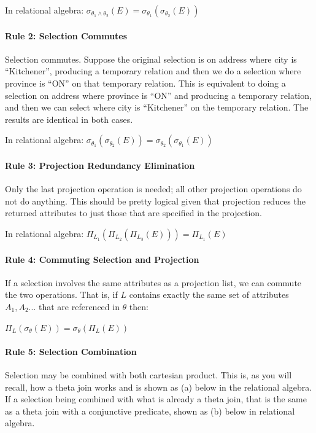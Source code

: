 In relational algebra: $\sigma_{\theta_{1} \wedge \theta_{2}}(E) = \sigma_{\theta_{1}}(\sigma_{\theta_{2}}(E))$


\paragraph{Rule 2: Selection Commutes}
Selection commutes. Suppose the original selection is on address where city is ``Kitchener'', producing a temporary relation and then we do a selection where province is ``ON'' on that temporary relation. This is equivalent to doing a selection on address where province is ``ON'' and producing a temporary relation, and then we can select where city is ``Kitchener'' on the temporary relation. The results are identical in both cases. 

In relational algebra: $\sigma_{\theta_{1}}(\sigma_{\theta_{2}}(E)) = \sigma_{\theta_{2}}(\sigma_{\theta_{1}}(E))$

\paragraph{Rule 3: Projection Redundancy Elimination}

Only the last projection operation is needed; all other projection operations do not do anything. This should be pretty logical given that projection reduces the returned attributes to just those that are specified in the projection.

In relational algebra: $\Pi_{L_{1}}(\Pi_{L_{2}}(\Pi_{L_{3}}(E))) = \Pi_{L_{1}}(E)$

\paragraph{Rule 4: Commuting Selection and Projection}
If a selection involves the same attributes as a projection list, we can commute the two operations. That is, if $L$ contains exactly the same set of attributes $A_{1}, A_{2}...$ that are referenced in $\theta$ then:

$\Pi_{L}(\sigma_{\theta}(E)) = \sigma_{\theta}(\Pi_{L}(E))$

\paragraph{Rule 5: Selection Combination}

Selection may be combined with both cartesian product. This is, as you will recall, how a theta join works and is shown as (a) below in the relational algebra. If a selection being combined with what is already a theta join, that is the same as a theta join with a conjunctive predicate, shown as (b) below in relational algebra.

